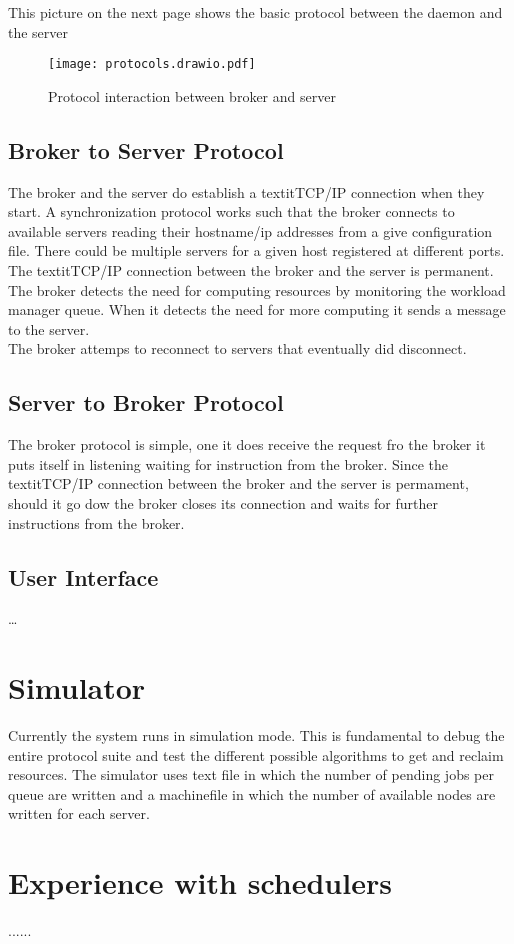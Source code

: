\documentclass{report}
\begin{document}
This picture on the next page shows the basic protocol between the daemon and the server

\begin{figure}[h]
  \centering
  \texttt{[image: protocols.drawio.pdf]}
    \caption{Protocol interaction between broker and server}
    \label{fig:enter-label}
\end{figure}

\section{Broker to Server Protocol}
The broker and the server do establish a textit{TCP/IP} connection when they start.
A synchronization protocol works such that the broker connects to available
servers reading their hostname/ip addresses from a give configuration file.
There could be multiple servers for a given host registered at different ports.
The textit{TCP/IP} connection between the broker and the server is permanent.\\

The broker detects the need for computing resources by monitoring the workload
manager queue. When it detects the need for more computing it sends a message to
the server.\\

The broker attemps to reconnect to servers that eventually did disconnect.

\section{Server to Broker Protocol}

The broker protocol is simple, one it does receive the request fro the broker it
puts itself in listening waiting for instruction from the broker. Since the
textit{TCP/IP} connection between the broker and the server is permament, should
it go dow the broker closes its connection and waits for further instructions
from the broker.


\section{User Interface}
\ldots
\chapter{Simulator}

Currently the system runs in simulation mode. This is fundamental to debug the entire protocol suite and test the different possible algorithms to get and reclaim resources. The simulator uses text file in which the number of pending jobs per queue are written and a machinefile in which the number of available nodes are written for each server.

\chapter{Experience with schedulers}
......

\end{document}
